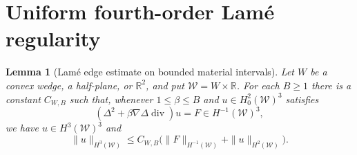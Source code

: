 \documentclass[11pt,a4paper]{article}
\newtheorem{lemma}[theorem]{Lemma}
\theoremstyle{remark}
\numberwithin{equation}{section}
\begin{document}
\section{Uniform fourth-order Lam\'e regularity}
\label{sec:g-lameuniform}

\begin{lemma}[Lam\'e edge estimate on bounded material intervals]
\label{lem:g-lame-edge-bounded}
Let $W$ be a convex wedge, a half-plane, or $\mathbb R^2$, and put
$\mathcal W=W\times\mathbb R$. For each $B\ge1$ there is a constant
$C_{W,B}$ such that, whenever $1\le\beta\le B$ and
$u\in H^2_0(\mathcal W)^3$ satisfies
\[
 (\Delta^2+\beta\nabla\Delta\operatorname{div})u
       =F\in H^{-1}(\mathcal W)^3,
\]
we have $u\in H^3(\mathcal W)^3$ and
\begin{equation}\label{eq:g-lame-edge-bounded}
 \|u\|_{H^3(\mathcal W)}
 \le C_{W,B}\bigl(\|F\|_{H^{-1}(\mathcal W)}
                         +\|u\|_{H^2(\mathcal W)}\bigr).
\end{equation}
\end{lemma}
\end{document}
